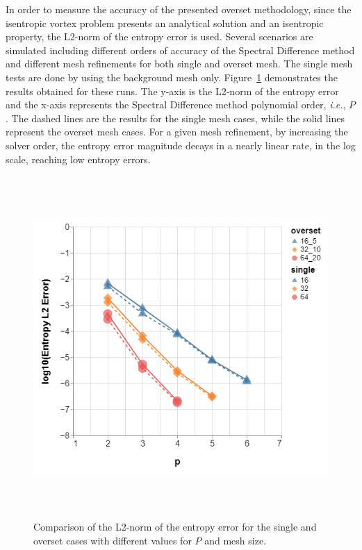 In order to measure the accuracy of the presented overset methodology, since the isentropic vortex problem presents an analytical solution and an isentropic property, the L2-norm of the entropy error is used. Several scenarios are simulated including different orders of accuracy of the Spectral Difference method and different mesh refinements for both single and overset mesh. The single mesh tests are done by using the background mesh only. Figure\ \ref{fig:entropy_vortex} demonstrates the results obtained for these runs. The y-axis is the L2-norm of the entropy error and the x-axis represents the Spectral Difference method polynomial order, {\em i.e.}, $P$. The dashed lines are the results for the single mesh cases, while the solid lines represent the overset mesh cases. For a given mesh refinement, by increasing the solver order, the entropy error magnitude decays in a nearly linear rate, in the log scale, reaching low entropy errors.
%
\begin{figure}[H]
	\centering
   	\includegraphics[height=13.0cm]{figs/results/vortex_32_10/entropy_error.png}
    \caption{Comparison of the L2-norm of the entropy error for the single and overset cases with different values for $P$ and mesh size.}
    \label{fig:entropy_vortex}
\end{figure}

